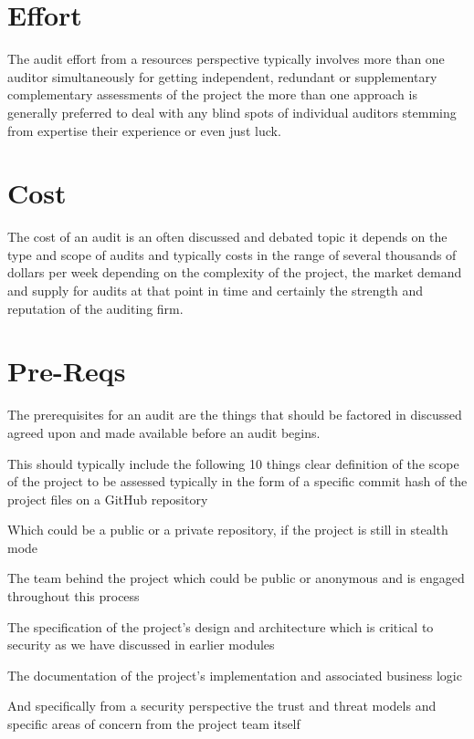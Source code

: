 \section{Effort}

The audit effort from a resources perspective typically involves more than one auditor simultaneously for getting independent, redundant or supplementary complementary assessments of the project the more than one approach is generally preferred to deal with any blind spots of individual auditors stemming from expertise their experience or even just luck.

\section{Cost}

The cost of an audit is an often discussed and debated topic it depends on the type and scope of audits and typically costs in the range of several thousands of dollars per week depending on the complexity of the project, the market demand and supply for audits at that point in time and certainly the strength and reputation of the auditing firm.

\section{Pre-Reqs}

The prerequisites for an audit are the things that should be factored in discussed agreed upon and made available before an audit begins. 

This should typically include the following 10 things clear definition of the scope of the project to be assessed typically in the form of a specific commit hash of the project files on a GitHub repository

Which could be a public or a private repository, if the project is still in stealth mode

The team behind the project which could be public or anonymous and is engaged throughout this process 

The specification of the project's design and architecture which is critical to security as we have discussed in earlier modules 

The documentation of the project's implementation and associated business logic 

And specifically from a security perspective the trust and threat models and specific areas of concern from the project team itself 

